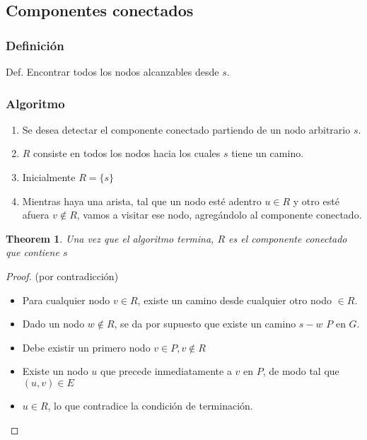 \documentclass[12pt, fleqn]{article}
\newtheorem{theorem}{Theorem}[section]
\theoremstyle{definition}
\begin{document}
        \subsection{Componentes conectados}
            \subsubsection{Definición}    
                Def. Encontrar todos los nodos alcanzables desde $s$.
            \subsubsection{Algoritmo}
                \begin{enumerate}
                    \item Se desea detectar el componente conectado partiendo de un nodo arbitrario $s$.
                    \item $R$ consiste en todos los nodos hacia los cuales $s$ tiene un camino.
                    \item Inicialmente $R = \{s\}$
                    \item Mientras haya una arista, tal que un nodo esté adentro $u \in R$ y otro esté afuera $v \notin R$,
                        vamos a visitar ese nodo, agregándolo al componente conectado.
                \end{enumerate}    
            \begin{theorem}
                Una vez que el algoritmo termina, $R$ es el componente conectado que contiene $s$
            \end{theorem}
            \begin{proof}
                (por contradicción)
                \begin{itemize}
                    \item  Para cualquier nodo $v \in R$, existe un camino desde cualquier otro nodo $\in R$.
                    \item Dado un nodo $w \notin R$, se da por supuesto  que existe un camino $s-w$ $P$ en $G$.
                    \item Debe existir un primero nodo $v \in P, v \notin R$
                    \item Existe un nodo $u$ que precede inmediatamente a $v$ en $P$, de modo tal que $(u,v) \in E$
                    \item $u \in R$, lo que contradice la condición de terminación.  
                \end{itemize}
            \end{proof}
\end{document}
